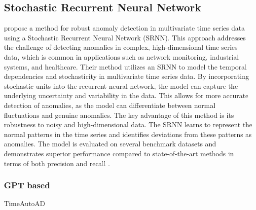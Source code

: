 \subsection{Stochastic Recurrent Neural Network}
 propose a method for robust anomaly detection in multivariate time series data using a Stochastic Recurrent Neural Network (SRNN). This approach addresses the challenge of detecting anomalies in complex, high-dimensional time series data, which is common in applications such as network monitoring, industrial systems, and healthcare.
Their method utilizes an SRNN to model the temporal dependencies and stochasticity in multivariate time series data. By incorporating stochastic units into the recurrent neural network, the model can capture the underlying uncertainty and variability in the data. This allows for more accurate detection of anomalies, as the model can differentiate between normal fluctuations and genuine anomalies.
The key advantage of this method is its robustness to noisy and high-dimensional data. The SRNN learns to represent the normal patterns in the time series and identifies deviations from these patterns as anomalies. The model is evaluated on several benchmark datasets and demonstrates superior performance compared to state-of-the-art methods in terms of both precision and recall \cite{su_robust_2019}.
\subsubsection{GPT based}
\cite{jiao_timeautoad_2022} TimeAutoAD\\\\ %
